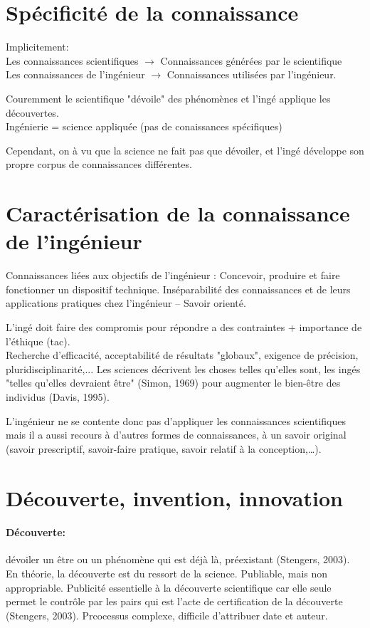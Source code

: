 \documentclass{report}
\begin{document}
	\section{Spécificité de la connaissance}
	
	Implicitement:\\
	Les connaissances scientifiques $\rightarrow$ Connaissances générées par le scientifique\\
	Les connaissances de l’ingénieur $\rightarrow$ Connaissances utilisées par l’ingénieur.
	
	Couremment le scientifique "dévoile" des phénomènes et l'ingé applique les découvertes.\\
	Ingénierie = science appliquée (pas de conaissances spécifiques)
	
	Cependant, on à vu que la science ne fait pas que dévoiler, et l'ingé développe son propre corpus de connaissances différentes.
	
	\section{Caractérisation de la connaissance de l’ingénieur}
	
	Connaissances liées aux objectifs de l’ingénieur : Concevoir, produire et faire fonctionner un dispositif technique. Inséparabilité des connaissances et de leurs applications pratiques chez l’ingénieur – Savoir orienté.
	
	L'ingé doit faire des compromis pour répondre a des contraintes + importance de l'éthique (tac).\\
	Recherche d'efficacité, acceptabilité de résultats "globaux", exigence de précision, pluridisciplinarité,... Les sciences décrivent les choses telles qu'elles sont, les ingés "telles qu'elles devraient être" (Simon, 1969) pour augmenter le bien-être des individus (Davis, 1995).
	
	L’ingénieur ne se contente donc pas d’appliquer les connaissances scientifiques mais il a aussi recours à d’autres formes de connaissances, à un savoir original (savoir prescriptif, savoir-faire pratique, savoir relatif à la conception,…).
	
	\section{Découverte, invention, innovation}
	
	\paragraph{Découverte:} dévoiler \og un être ou un phénomène qui est déjà là, préexistant \fg (Stengers, 2003). En théorie, la découverte est du ressort de la science. Publiable, mais non appropriable. Publicité essentielle à la découverte scientifique car elle seule permet le contrôle par les pairs qui est l’acte de certification de la découverte (Stengers, 2003). Prcocessus complexe, difficile d'attribuer date et auteur.
	
\end{document}

